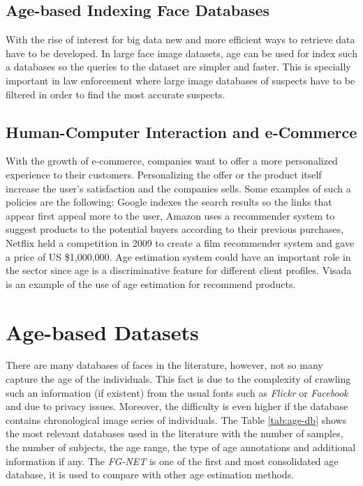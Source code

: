 \subsection{Age-based Indexing Face Databases}
With the rise of interest for big data new and more efficient ways to retrieve data have to be developed. In large face image datasets, age can be used for index such a databases so the queries to the dataset are simpler and faster. This is specially important in law enforcement where large image databases of suspects have to be filtered in order to find the most accurate suspects.

\subsection{Human-Computer Interaction and e-Commerce}
With the growth of e-commerce, companies want to offer a more personalized experience to their customers. Personalizing the offer or the product itself increase the user's satisfaction and the companies sells. Some examples of such a policies are the following: Google \cite{Brin:1998:ALH:297810.297827} indexes the search results so the links that appear first appeal more to the user, Amazon \cite{Linden:2003:ARI:642462.642471} uses a recommender system to suggest products to the potential buyers according to their previous purchases, Netflix \cite{Koren:2009:MFT:1608565.1608614} held a competition in 2009 to create a film recommender system and gave a price of US \$1,000,000. Age estimation system could have an important role in the sector since age is a discriminative feature for different client profiles. Visada \cite{visada} is an example of the use of age estimation for recommend products.


\section{Age-based Datasets} \label{sec:ageDB}
There are many databases of faces in the literature, however, not so many capture the age of the individuals. This fact is due to the complexity of crawling such an information (if existent) from the usual fonts such as \textit{Flickr} or \textit{Facebook} and due to privacy issues. Moreover, the difficulty is even higher if the database contains chronological image series of individuals. The Table \ref{tab:age-db} shows the most relevant databases used in the literature with the number of samples, the number of subjects, the age range, the type of age annotations and additional information if any. The \textit{FG-NET} \cite{993553} is one of the first and most consolidated age database, it is used to compare with other age estimation methods.

